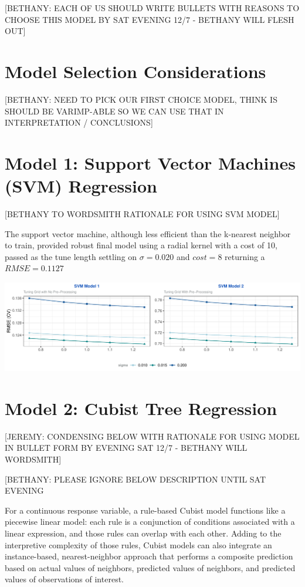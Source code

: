 \documentclass[]{report}
\begin{document}
{[}BETHANY: EACH OF US SHOULD WRITE BULLETS WITH REASONS TO CHOOSE THIS
MODEL BY SAT EVENING 12/7 - BETHANY WILL FLESH OUT{]}

\hypertarget{model-selection-considerations}{%
\section{Model Selection
Considerations}\label{model-selection-considerations}}

{[}BETHANY: NEED TO PICK OUR FIRST CHOICE MODEL, THINK IS SHOULD BE
VARIMP-ABLE SO WE CAN USE THAT IN INTERPRETATION / CONCLUSIONS{]}

\hypertarget{model-1-support-vector-machines-svm-regression}{%
\section{Model 1: Support Vector Machines (SVM)
Regression}\label{model-1-support-vector-machines-svm-regression}}

{[}BETHANY TO WORDSMITH RATIONALE FOR USING SVM MODEL{]}

The support vector machine, although less efficient than the k-nearest
neighbor to train, provided robust final model using a radial kernel
with a cost of 10, passed as the tune length settling on
\(\sigma = 0.020\) and \(cost = 8\) returning a \(RMSE = 0.1127\)

\includegraphics{Group2_Project2_Fall2019_files/figure-latex/unnamed-chunk-9-1.pdf}

\hypertarget{model-2-cubist-tree-regression}{%
\section{Model 2: Cubist Tree
Regression}\label{model-2-cubist-tree-regression}}

{[}JEREMY: CONDENSING BELOW WITH RATIONALE FOR USING MODEL IN BULLET
FORM BY EVENING SAT 12/7 - BETHANY WILL WORDSMITH{]}

{[}BETHANY: PLEASE IGNORE BELOW DESCRIPTION UNTIL SAT EVENING

For a continuous response variable, a rule-based Cubist model functions
like a piecewise linear model: each rule is a conjunction of conditions
associated with a linear expression, and those rules can overlap with
each other. Adding to the interpretive complexity of those rules, Cubist
models can also integrate an instance-based, nearest-neighbor approach
that performs a composite prediction based on actual values of
neighbors, predicted values of neighbors, and predicted values of
observations of interest.
\end{document}
